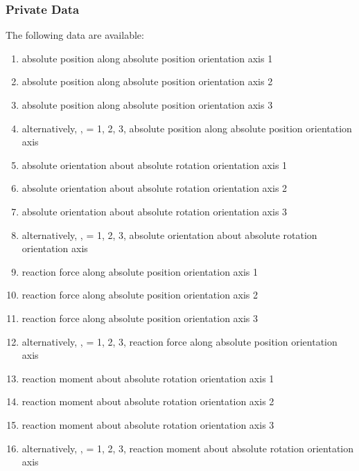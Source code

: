\subsubsection{Private Data}
The following data are available:
\begin{enumerate}
\item {} absolute position along absolute position orientation axis 1
\item {} absolute position along absolute position orientation axis 2
\item {} absolute position along absolute position orientation axis 3

\item[-] alternatively, ,  = 1, 2, 3, absolute position along absolute position orientation axis 

\item {} absolute orientation about absolute rotation orientation axis 1
\item {} absolute orientation about absolute rotation orientation axis 2
\item {} absolute orientation about absolute rotation orientation axis 3

\item[-] alternatively, ,  = 1, 2, 3, absolute orientation about absolute rotation orientation axis 

\item {} reaction force along absolute position orientation axis 1
\item {} reaction force along absolute position orientation axis 2
\item {} reaction force along absolute position orientation axis 3

\item[-] alternatively, ,  = 1, 2, 3, reaction force along absolute position orientation axis 

\item {} reaction moment about absolute rotation orientation axis 1
\item {} reaction moment about absolute rotation orientation axis 2
\item {} reaction moment about absolute rotation orientation axis 3

\item[-] alternatively, ,  = 1, 2, 3, reaction moment about absolute rotation orientation axis 


\end{enumerate}
